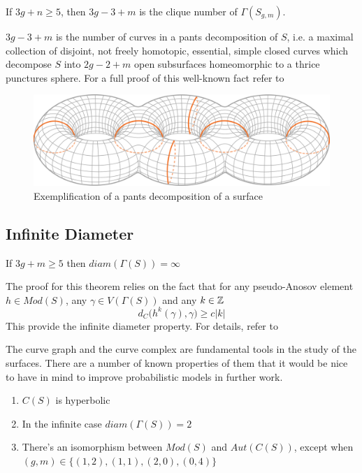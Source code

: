 \begin{theorem}
If $3g+n\geq 5$, then $3g - 3 + m$ is the clique number of $\Gamma(S_{g,m})$.
\end{theorem}

$3g-3+m$ is the number of curves in a pants decomposition of $S$, i.e. a maximal collection of disjoint, not freely homotopic, essential, simple closed curves which decompose $S$ into $2g-2+m$ open subsurfaces homeomorphic to a thrice punctures sphere. For a full proof of this well-known fact refer to \cite[Hatcher]{Pants}

\vspace{1cm}
\begin{figure}[h!]
	\centering
	\includegraphics[scale=0.5]{Figures/Pantalones.png}
	\caption{Exemplification of a pants decomposition of a surface}
\end{figure}

\subsection{Infinite Diameter}
\begin{theorem}
If $3g+m\geq 5$ then $diam(\Gamma(S)) = \infty$
\end{theorem}

The proof for this theorem relies on the fact that for any pseudo-Anosov element $h \in Mod(S)$, any $\gamma \in V(\Gamma(S))$ and any $k\in \mathbb{Z}$
$$d_{C}\Big(h^{k}(\gamma), \gamma\Big) \geq c|k|$$
This provide the infinite diameter property. For details, refer to \cite[Masur and Minsky]{Masur}

The curve graph and the curve complex are fundamental tools in the study of the surfaces. There are a number of known properties of them that it would be nice to have in mind to improve probabilistic models in further work.

\begin{enumerate}
\item $C(S)$ is hyperbolic
\item In the infinite case $diam(\Gamma(S))= 2$
\item There's an isomorphism between $Mod(S)$ and $Aut(C(S))$, except when $(g,m) \in \{(1,2), (1,1), (2,0), (0,4)\}$
\end{enumerate}

